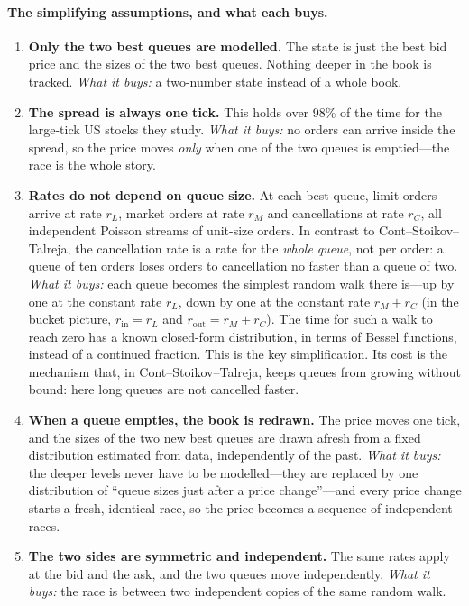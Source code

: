 \paragraph{The simplifying assumptions, and what each buys.}
\begin{enumerate}[leftmargin=1.8em,itemsep=3pt]
\item \textbf{Only the two best queues are modelled.} The state is just the best bid price and the sizes
  of the two best queues. Nothing deeper in the book is tracked.
  \emph{What it buys:} a two-number state instead of a whole book.
\item \textbf{The spread is always one tick.} This holds over 98\% of the time for the large-tick US stocks
  they study. \emph{What it buys:} no orders can arrive inside the spread, so the price moves \emph{only}
  when one of the two queues is emptied---the race is the whole story.
\item \textbf{Rates do not depend on queue size.} At each best queue, limit orders arrive at rate $r_L$,
  market orders at rate $r_M$ and cancellations at rate $r_C$, all independent Poisson streams of
  unit-size orders. In contrast to Cont--Stoikov--Talreja, the cancellation rate is a rate for the
  \emph{whole queue}, not per order: a queue of ten orders loses orders to cancellation no faster than a
  queue of two. \emph{What it buys:} each queue becomes the simplest random walk there is---up by one at
  the constant rate $r_L$, down by one at the constant rate $r_M + r_C$ (in the bucket picture,
  $r_{\text{in}} = r_L$ and $r_{\text{out}} = r_M + r_C$). The time for such a walk to reach zero has a
  known closed-form distribution, in terms of Bessel functions, instead of a continued fraction. This is
  the key simplification. Its cost is the mechanism that, in Cont--Stoikov--Talreja, keeps queues from
  growing without bound: here long queues are not cancelled faster.
\item \textbf{When a queue empties, the book is redrawn.} The price moves one tick, and the sizes of the
  two new best queues are drawn afresh from a fixed distribution estimated from data, independently of
  the past. \emph{What it buys:} the deeper levels never have to be modelled---they are replaced by one
  distribution of ``queue sizes just after a price change''---and every price change starts a fresh,
  identical race, so the price becomes a sequence of independent races.
\item \textbf{The two sides are symmetric and independent.} The same rates apply at the bid and the ask,
  and the two queues move independently. \emph{What it buys:} the race is between two independent copies
  of the same random walk.
\end{enumerate}
